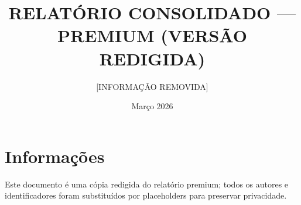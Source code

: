 \documentclass[12pt,a4paper,oneside]{article}
\begin{document}
\title{RELATÓRIO CONSOLIDADO — PREMIUM (VERSÃO REDIGIDA)}
\author{[INFORMAÇÃO REMOVIDA]}
\date{Março 2026}
\maketitle

\section*{Informações}
Este documento é uma cópia redigida do relatório premium; todos os autores e identificadores foram substituídos por placeholders para preservar privacidade.
\end{document}
